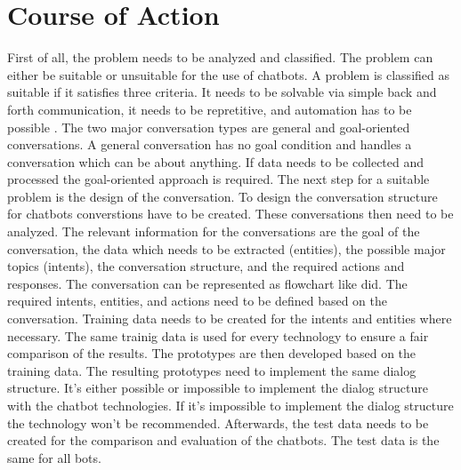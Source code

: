 

\section{Course of Action} %
First of all, the problem needs to be analyzed and classified.
The problem can either be suitable or unsuitable for the use of chatbots.
A problem is classified as suitable if it satisfies three criteria. 
It needs to be solvable via simple back and forth communication,
it needs to be repretitive, and automation has to be possible \citet{singhbuilding}.
The two major conversation types are general and goal-oriented conversations.
A general conversation has no goal condition and handles a conversation which can be 
about anything. 
If data needs to be collected and processed the goal-oriented approach is required.
The next step for a suitable problem is the design of the conversation.
To design the conversation structure for chatbots converstions have to be created.
These conversations then need to be analyzed.
The relevant information for the conversations are the goal of the conversation, the 
data which needs to be extracted (entities), the possible major topics (intents), 
the conversation structure, and the required actions and responses.
The conversation can be represented as flowchart like \citet{singhbuilding} did.
The required intents, entities, and actions need to be defined based on the conversation.
Training data needs to be created for the intents and entities where necessary.
The same trainig data is used for every technology to ensure a fair 
comparison of the results.
The prototypes are then developed based on the training data.
The resulting prototypes need to implement the same dialog structure.
It's either possible or impossible to implement the dialog structure with the 
chatbot technologies. 
If it's impossible to implement the dialog structure the technology 
won't be recommended.
Afterwards, the test data needs to be created for the comparison and evaluation of 
the chatbots.
The test data is the same for all bots.


